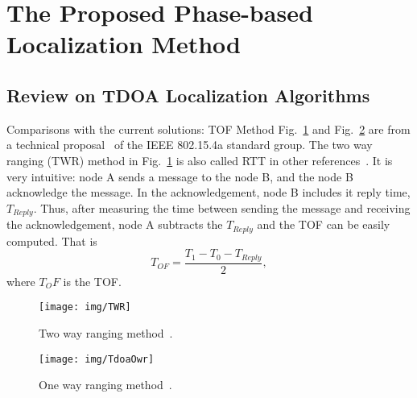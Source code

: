 \section{The Proposed Phase-based Localization Method}%
\subsection{Review on TDOA Localization Algorithms}
Comparisons with the current solutions: TOF Method
Fig.~\ref{f:twr} and Fig.~\ref{f:tdoaowr} are from a technical proposal~\cite{aetherwireProp} of the IEEE 802.15.4a standard group. The two way ranging (TWR) method in Fig.~\ref{f:twr} is also called RTT in other references~\cite{PawariLocatingTheNodes05}. It is very intuitive: node A sends a message to the node B, and the node B acknowledge the message. In the acknowledgement, node B includes it reply time, $T_{Reply}$. Thus, after measuring the time between sending the message and receiving the acknowledgement, node A subtracts the $T_{Reply}$ and the TOF can be easily computed. That is $$T_{OF}=\frac{T_1-T_0-T_{Reply}}{2},$$
where $T_OF$ is the TOF.

\begin{figure}
  \centering
  \texttt{[image: img/TWR]}\\
  \caption{Two way ranging method~\cite{aetherwireProp}.}\label{f:twr}
\end{figure}

\begin{figure}
  \centering
  \texttt{[image: img/TdoaOwr]}\\
  \caption{One way ranging method~\cite{aetherwireProp}.}\label{f:tdoaowr}
\end{figure}


